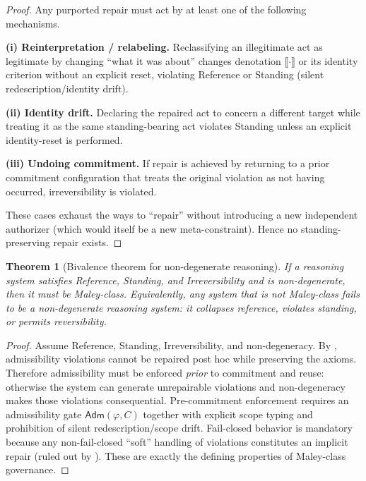 \documentclass[11pt]{article}
\newtheorem{theorem}{Theorem}[section]
\theoremstyle{definition}
\newcommand{\Adm}{\mathsf{Adm}}
\begin{document}
\begin{proof}
Any purported repair must act by at least one of the following mechanisms.

\textbf{(i) Reinterpretation / relabeling.} Reclassifying an illegitimate act as legitimate by changing ``what it was about'' changes denotation $\llbracket\cdot\rrbracket$ or its identity criterion without an explicit reset, violating Reference or Standing (silent redescription/identity drift).

\textbf{(ii) Identity drift.} Declaring the repaired act to concern a different target while treating it as the same standing-bearing act violates Standing unless an explicit identity-reset is performed.

\textbf{(iii) Undoing commitment.} If repair is achieved by returning to a prior commitment configuration that treats the original violation as not having occurred, irreversibility is violated.

These cases exhaust the ways to ``repair'' without introducing a new independent authorizer (which would itself be a new meta-constraint). Hence no standing-preserving repair exists.
\end{proof}

\begin{theorem}[Bivalence theorem for non-degenerate reasoning]
\label{thm:bivalence}
If a reasoning system satisfies Reference, Standing, and Irreversibility and is non-degenerate, then it must be Maley-class.
Equivalently, any system that is not Maley-class fails to be a non-degenerate reasoning system: it collapses reference, violates standing, or permits reversibility.
\end{theorem}

\begin{proof}
Assume Reference, Standing, Irreversibility, and non-degeneracy.
By , admissibility violations cannot be repaired post hoc while preserving the axioms.
Therefore admissibility must be enforced \emph{prior} to commitment and reuse: otherwise the system can generate unrepairable violations and non-degeneracy makes those violations consequential.
Pre-commitment enforcement requires an admissibility gate $\Adm(\varphi,C)$ together with explicit scope typing and prohibition of silent redescription/scope drift.
Fail-closed behavior is mandatory because any non-fail-closed ``soft'' handling of violations constitutes an implicit repair (ruled out by ).
These are exactly the defining properties of Maley-class governance.
\end{proof}
\end{document}
